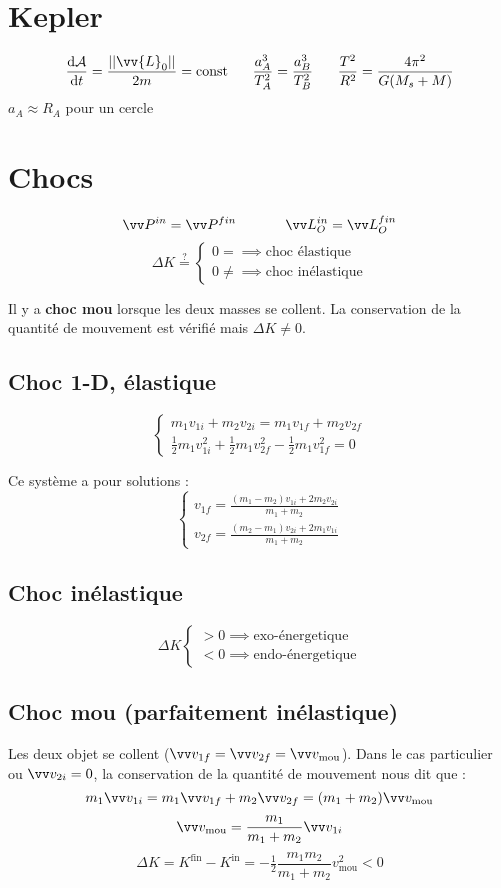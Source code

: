 \documentclass[../main.tex]{subfiles}
\begin{document}
\section{Kepler}
\[
  \dv{\mathcal{A}}{t}=\frac{||\vv{L}_0||}{2m}=\text{const} \phantom{text} \frac{a_A^3}{T_A^2}=\frac{a_B^3}{T_B^2}\phantom{text} \frac{T^2}{R^2}=\frac{4 \pi^2}{G(M_s + M)}
\]
\(a_A\approx R_A\) pour un cercle
\section{Chocs}
\[
  \Qm^{in}=\Qm^{fin} \phantom{texttext}
  \mc^{in}_O=\mc^{fin}_O
\]
\[ \Delta K \overset{?}{=}
  \begin{cases}
    0 = \implies \text{choc élastique}\\
    0 \neq \implies \text{choc inélastique}
  \end{cases}
\]

Il y a \textbf{choc mou} lorsque les deux masses se collent. La conservation de la quantité de mouvement est vérifié mais \(\Delta K \neq 0\).

\subsection{Choc 1-D, élastique}
\[
  \begin{cases}
    m_1 v_{1i} + m_2v_{2i} = m_1 v_{1f} + m_2 v_{2f} \\ 
    \tfrac{1}{2}m_1 v_{1i}^2 + \tfrac{1}{2}m_1 v_{2f}^2 - \tfrac{1}{2}m_1 v_{1f}^2 = 0
  \end{cases}
\]

Ce système a pour solutions :
\[
  \begin{cases}
    v_{1f} = \frac{(m_1-m_2)v_{1i} + 2m_2v_{2i}}{m_1+m_2} \\
    v_{2f} = \frac{(m_2-m_1)v_{2i} + 2m_1v_{1i}}{m_1+m_2}
  \end{cases}
\]

\subsection{Choc inélastique}
\[
  \Delta K 
  \begin{cases}
    > 0 \implies \text{exo-énergetique} \\
    < 0 \implies \text{endo-énergetique}
  \end{cases}
\]

\subsection{Choc mou (parfaitement inélastique)}
Les deux objet se collent (\(\vi_{1f}=\vi_{2f}=\vi_{\text{mou}}\)). Dans le cas particulier ou \(\vi_{2i}=0\), la conservation de la quantité de mouvement nous dit que : 
\[
  m_1\vi_{1i} = m_1\vi_{1f} + m_2\vi_{2f} = (m_1 + m_2)\vi_{\text{mou}} 
\]
\[
  \vi_{\text{mou}} = \frac{m_1}{m_1 + m_2}\vi_{1i}
\]
\[
  \Delta K = K^{\text{fin}} - K^{\text{in}}= -\tfrac{1}{2}\frac{m_1m_2}{m_1+m_2}v_{\text{mou}}^2 < 0 
\]
\end{document}
